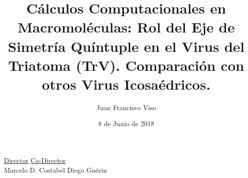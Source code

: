 \documentclass[8pt]{beamer}
\title[Rol del Eje de Simetría Quíntuple en TrV]{\textbf{Cálculos Computacionales en Macromoléculas: Rol del Eje de Simetría Quíntuple en el Virus del Triatoma (TrV). Comparación con otros Virus Icosaédricos.}}
\author{Juan Francisco Viso}
\institute{Universidad Nacional del Sur \\ Instituto de Física del Sur}
\date{8 de Junio de 2018}
\begin{document}
\begin{frame}
  \titlepage
   \begin{center}
   \begin{minipage}{0.9\textwidth}
     \centering
     \underline{Director} \hfill \underline{Co-Director} \\ Marcelo D. Costabel \hfill Diego Guérin
    \end{minipage}
  \end{center}
\end{frame}

\begin{frame}[t]
\justifying
\begin{figure}
\Centering
{}

\end{figure}
\end{frame}
\end{document}
